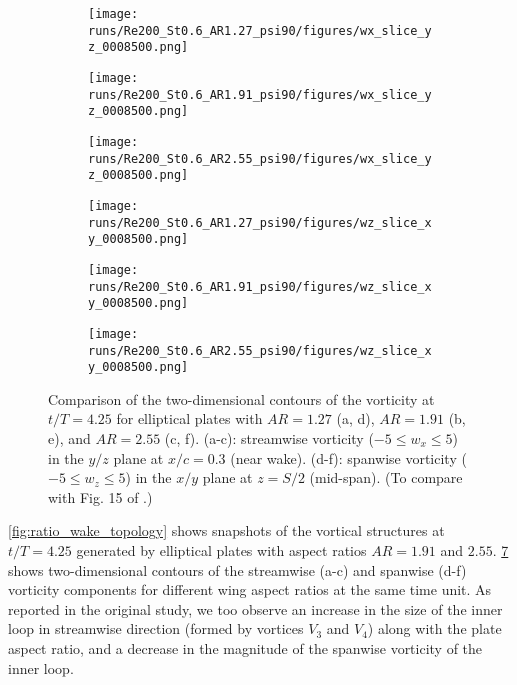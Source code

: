\begin{figure}
  \centering
  \begin{subfigure}[c]{0.3\textwidth}
    \centering
    \texttt{[image: runs/Re200\_St0.6\_AR1.27\_psi90/figures/wx\_slice\_yz\_0008500.png]}
    \caption{}
    \label{fig:ratio_vorticity_slices:1.27_wx}
  \end{subfigure}
  \begin{subfigure}[c]{0.3\textwidth}
    \centering
    \texttt{[image: runs/Re200\_St0.6\_AR1.91\_psi90/figures/wx\_slice\_yz\_0008500.png]}
    \caption{}
    \label{fig:ratio_vorticity_slices:1.91_wx}
  \end{subfigure}
  \begin{subfigure}[c]{0.34\textwidth}
    \centering
    \texttt{[image: runs/Re200\_St0.6\_AR2.55\_psi90/figures/wx\_slice\_yz\_0008500.png]}
    \caption{}
    \label{fig:ratio_vorticity_slices:2.55_wx}
  \end{subfigure}
  \vspace{0.5cm}
  \begin{subfigure}[c]{0.32\textwidth}
    \centering
    \texttt{[image: runs/Re200\_St0.6\_AR1.27\_psi90/figures/wz\_slice\_xy\_0008500.png]}
    \caption{}
    \label{fig:ratio_vorticity_slices:1.27_wz}
  \end{subfigure}
  \begin{subfigure}[c]{0.32\textwidth}
    \centering
    \texttt{[image: runs/Re200\_St0.6\_AR1.91\_psi90/figures/wz\_slice\_xy\_0008500.png]}
    \caption{}
    \label{fig:ratio_vorticity_slices:1.91_wz}
  \end{subfigure}
  \begin{subfigure}[c]{0.32\textwidth}
    \centering
    \texttt{[image: runs/Re200\_St0.6\_AR2.55\_psi90/figures/wz\_slice\_xy\_0008500.png]}
    \caption{}
    \label{fig:ratio_vorticity_slices:2.55_wz}
  \end{subfigure}
  \caption{Comparison of the two-dimensional contours of the vorticity at $t/T = 4.25$ for elliptical plates with $AR = 1.27$ (a, d), $AR = 1.91$ (b, e), and $AR = 2.55$ (c, f). (a-c): streamwise vorticity ($-5 \leq w_x \leq 5$) in the $y/z$ plane at $x/c = 0.3$ (near wake). (d-f): spanwise vorticity ($-5 \leq w_z \leq 5$) in the $x/y$ plane at $z = S/2$ (mid-span). (To compare with Fig. 15 of \citet{li_dong_2016}.)}
  \label{fig:ratio_vorticity_slices}
\end{figure}

\cref{fig:ratio_wake_topology} shows snapshots of the vortical structures at $t/T = 4.25$ generated by elliptical plates with aspect ratios $AR = 1.91$ and $2.55$.
\cref{fig:ratio_vorticity_slices} shows two-dimensional contours of the streamwise (a-c) and spanwise (d-f) vorticity components for different wing aspect ratios at the same time unit.
As reported in the original study, we too observe an increase in the size of the inner loop in streamwise direction (formed by vortices $V_3$ and $V_4$) along with the plate aspect ratio, and a decrease in the magnitude of the spanwise vorticity of the inner loop.

